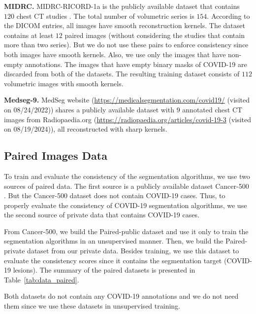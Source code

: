\textbf{MIDRC.} MIDRC-RICORD-1a is the publicly available dataset that contains $120$ chest CT studies \cite{tsai2021rsna}. The total number of volumetric series is $154$. According to the DICOM entries, {all} images have smooth reconstruction kernels. The dataset contains at least $12$ paired images (without considering the studies that contain more than two series). But we do not use these pairs to enforce consistency since both images have smooth kernels. Also, we use only the images that have non-empty annotations. The images that have empty binary masks of COVID-19 are discarded from both of the datasets. The resulting training dataset consists of $112$ volumetric images with smooth kernels.

\textbf{Medseg-9.} MedSeg website ({\url{https://medicalsegmentation.com/covid19/}} (visited on 08/24/2022)) shares a publicly available dataset with $9$ annotated chest CT images from {Radiopaedia.org} ({\url{https://radiopaedia.org/articles/covid-19-3}} (visited on 08/19/2024)), all reconstructed with sharp kernels.


\subsection{Paired Images Data}

To train and evaluate the consistency of the segmentation algorithms, we use two sources of paired data. The first source is a publicly available dataset Cancer-500 \cite{morozov2021simplified}. But the Cancer-500 dataset does not contain COVID-19 cases. Thus, to properly evaluate the consistency of COVID-19 segmentation algorithms, we use the second source of private data that contains COVID-19 cases. 

From Cancer-500, we build the Paired-public dataset and use it only to train the segmentation algorithms in an unsupervised manner. Then, we build the Paired-private dataset from our private data. Besides training, we use this dataset to evaluate the consistency scores since it contains the segmentation target (COVID-19 lesions). The summary of the paired datasets is presented in Table~\ref{tab:data_paired}.



Both datasets do not contain any COVID-19 annotations and we do not need them since we use these datasets in unsupervised training.



